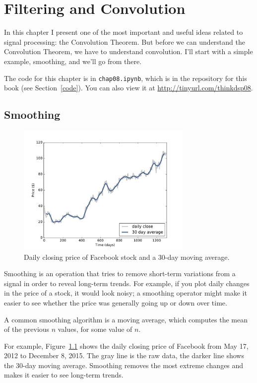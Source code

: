 \documentclass[12pt]{book}
\begin{document}
\chapter{Filtering and Convolution}

In this chapter I present one of the most important and useful
ideas related to signal processing: the Convolution Theorem.
But before we can understand the Convolution Theorem, we have to understand
convolution.  I'll start with a simple example, smoothing, and
we'll go from there.

The code for this chapter is in {\tt chap08.ipynb}, which is in the
repository for this book (see Section~\ref{code}).
You can also view it at \url{http://tinyurl.com/thinkdsp08}.


\section{Smoothing}
\label{smoothing}

\begin{figure}
\centerline{\includegraphics[height=2.5in]{figs/convolution1.pdf}}
\caption{Daily closing price of Facebook stock and a 30-day moving
average.}
\label{fig.convolution1}
\end{figure}

Smoothing is an operation that tries to remove short-term variations
from a signal in order to reveal long-term trends.  For example, if
you plot daily changes in the price of a stock, it would look noisy;
a smoothing operator might make it easier to see whether the price
was generally going up or down over time.  

A common smoothing algorithm is a moving average, which computes
the mean of the previous $n$ values, for some value of $n$.

For example, Figure~\ref{fig.convolution1} shows the daily
closing price of Facebook from May 17, 2012 to December 8,
2015.  The gray line
is the raw data, the darker line shows the 30-day moving average.
Smoothing removes the most
extreme changes and makes it easier to see long-term trends.
\end{document}

